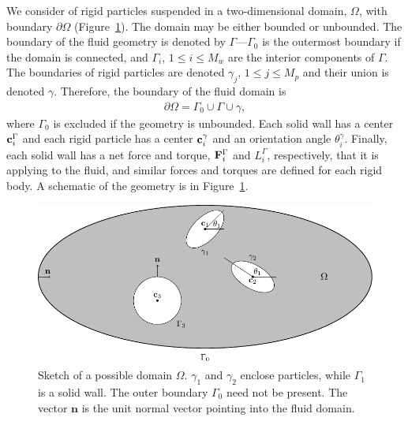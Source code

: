\documentclass[preprint, 10pt]{elsarticle}
\begin{document}
We consider of rigid particles suspended in a two-dimensional domain,
$\Omega$, with boundary $\partial\Omega$
(Figure~\ref{fig:geomSchematic}).  The domain may be either bounded or
unbounded.  The boundary of the fluid geometry is denoted by
$\Gamma$---$\Gamma_0$ is the outermost boundary if the domain is
connected, and $\Gamma_i$, $1\leq i \leq M_w$ are the interior
components of $\Gamma$.  The boundaries of rigid particles are denoted
$\gamma_j$, $1\leq j\leq M_p$ and their union is denoted $\gamma$.
Therefore, the boundary of the fluid domain is
\begin{align*}
  \partial\Omega =\Gamma_0\cup \Gamma \cup \gamma,
\end{align*} 
where $\Gamma_0$ is excluded if the geometry is unbounded. Each solid
wall has a center ${\mathbf{c}}^\Gamma_i$ and each rigid particle has a center
${\mathbf{c}}^\gamma_i$ and an orientation angle $\theta^\gamma_i$.  Finally,
each solid wall has a net force and torque, ${\mathbf{F}}^\Gamma_i$ and
$L^\Gamma_i$, respectively, that it is applying to the fluid, and
similar forces and torques are defined for each rigid body.  A schematic
of the geometry is in Figure~\ref{fig:geomSchematic}.


%

\begin{figure}[!h]
\begin{center}
\includegraphics{figures/multiply_connected.pdf}
\end{center}
\caption{\label{fig:geomSchematic}Sketch of a possible domain $\Omega$.
  $\gamma_1$ and $\gamma_2$ enclose particles, while $\Gamma_1$ is a
  solid wall. The outer boundary $\Gamma_0$ need not be present.  The
  vector $\mathbf{n}$ is the unit normal vector pointing into the fluid
  domain.}
\end{figure}
\end{document}
